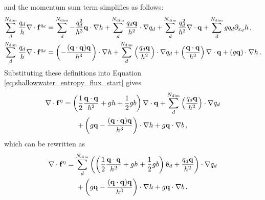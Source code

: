 and the momentum sum term simplifies as follows:
\begin{align}
  \sum\limits_d^{N_\text{dim}}\frac{q_d}{h}
    \nabla\cdot\mathbf{f}^{q_d}
  &= \sum\limits_d^{N_\text{dim}}-\frac{q_d^2}{h^3}
    \mathbf{q}\cdot\nabla h
  + \sum\limits_d^{N_\text{dim}}\frac{q_d\mathbf{q}}
    {h^2}\cdot\nabla q_d
  + \sum\limits_d^{N_\text{dim}}\frac{q_d^2}{h^2}
    \nabla\cdot\mathbf{q}
  + \sum\limits_d^{N_\text{dim}}gq_d\partial_{x_d}
    h \,,
  \\
  \sum\limits_d^{N_\text{dim}}\frac{q_d}{h}
    \nabla\cdot\mathbf{f}^{q_d}
  &= \left(-\frac{(\mathbf{q}\cdot\mathbf{q})\mathbf{q}}{h^3}\right)
    \cdot\nabla h
  + \sum\limits_d^{N_\text{dim}}\left(\frac{q_d\mathbf{q}}
    {h^2}\right)\cdot\nabla q_d
  + \left(\frac{\mathbf{q}\cdot\mathbf{q}}{h^2}\right)
    \nabla\cdot\mathbf{q}
  + \left(g\mathbf{q}\right)\cdot\nabla h \,.
\end{align}
Substituting these definitions into Equation
\eqref{eq:shallowwater_entropy_flux_start} gives
\begin{multline}
  \nabla\cdot\mathbf{f}^\eta
  = 
    \left(\frac{1}{2}\frac{\mathbf{q}\cdot\mathbf{q}}{h^2}
    + gh + \frac{1}{2}gb\right)
    \nabla\cdot\mathbf{q}
    + \sum\limits_d^{N_\text{dim}}\left( 
      \frac{q_d\mathbf{q}}{h^2}\right)
      \cdot\nabla q_d
    \\
    + \left(g\mathbf{q}
    - \frac{(\mathbf{q}\cdot\mathbf{q})\mathbf{q}}
    {h^3}\right)\cdot\nabla h
    + g\mathbf{q}\cdot\nabla b
  \,,
\end{multline}
which can be rewritten as
\begin{multline}\label{eq:shallowwater_divergence_coef}
  \nabla\cdot\mathbf{f}^\eta
  = 
    \sum\limits_d^{N_\text{dim}}\left(
    \left(\frac{1}{2}\frac{\mathbf{q}\cdot\mathbf{q}}{h^2}
    + gh + \frac{1}{2}gb\right)\hat{\mathbf{e}}_{d}
    + \frac{q_d\mathbf{q}}{h^2}\right)
      \cdot\nabla q_d
    \\
    + \left(g\mathbf{q}
    - \frac{(\mathbf{q}\cdot\mathbf{q})\mathbf{q}}
    {h^3}\right)\cdot\nabla h
    + g\mathbf{q}\cdot\nabla b
  \,.
\end{multline}
